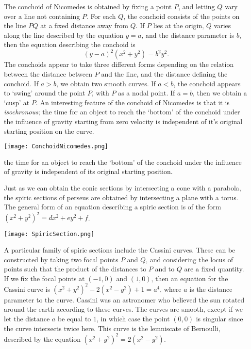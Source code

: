 \begin{example}
    The conchoid of Nicomedes is obtained by fixing a point $P$, and letting $Q$ vary over a line not containing $P$. For each $Q$, the conchoid consists of the points on the line $PQ$ at a fixed distance away from $Q$. If $P$ lies at the origin, $Q$ varies along the line described by the equation $y = a$, and the distance parameter is $b$, then the equation describing the conchoid is
    \[ (y-a)^2(x^2 + y^2) = b^2y^2. \]
    The conchoids appear to take three different forms depending on the relation between the distance between $P$ and the line, and the distance defining the conchoid. If $a > b$, we obtain two smooth curves. If $a < b$, the conchoid appears to `swing' around the point $P$, with $P$ as a nodal point. If $a = b$, then we obtain a `cusp' at $P$. An interesting feature of the conchoid of Nicomedes is that it is \emph{isochronous}; the time for an object to reach the `bottom' of the conchoid under the influence of gravity starting from zero velocity is independent of it's original starting position on the curve.
    \begin{center}
        \texttt{[image: ConchoidNicomedes.png]}
    \end{center}
    the time for an object to reach the `bottom' of the conchoid under the influence of gravity is independent of its original starting position.
\end{example}

\begin{example}
    Just as we can obtain the conic sections by intersecting a cone with a parabola, the spiric sections of perseus are obtained by intersecting a plane with a torus. The general form of an equation describing a spiric section is of the form $(x^2 + y^2)^2 = dx^2 + ey^2 + f$.
    \begin{center}
        \texttt{[image: SpiricSection.png]}
    \end{center}
    A particular family of spiric sections include the Cassini curves. These can be constructed by taking two focal points $P$ and $Q$, and considering the locus of points such that the product of the distances to $P$ and to $Q$ are a fixed quantity. If we fix the focal points at $(-1,0)$ and $(1,0)$, then an equation for the Cassini curve is $(x^2 + y^2)^2 - 2(x^2 - y^2) + 1 = a^4$, where $a$ is the distance parameter to the curve. Cassini was an astronomer who believed the sun rotated around the earth according to these curves. The curves are smooth, except if we let the distance $a$ be equal to $1$, in which case the point $(0,0)$ is singular since the curve intersects twice here. This curve is the lemniscate of Bernoulli, described by the equation $(x^2 + y^2)^2 = 2(x^2 - y^2)$.
\end{example}

